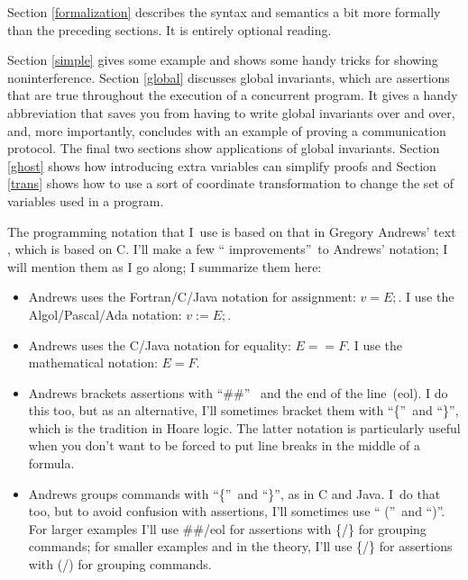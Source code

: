\documentclass[11pt]{article}%
\begin{document}
Section \ref{formalization} describes the syntax and semantics a bit more
formally than the preceding sections. It is entirely optional reading.

Section \ref{simple} gives some example and shows some handy tricks for
showing noninterference. Section \ref{global} discusses global invariants,
which are assertions that are true throughout the execution of a concurrent
program. It gives a handy abbreviation that saves you from having to write
global invariants over and over, and, more importantly, concludes with an
example of proving a communication protocol. The final two sections show
applications of global invariants. Section \ref{ghost} shows how introducing
extra variables can simplify proofs and Section \ref{trans} shows how to use a
sort of coordinate transformation to change the set of variables used in a program.

The programming notation that I\ use is based on that in Gregory Andrews' text
\cite{Andrews2000}, which is based on C. I'll make a few \textquotedblleft
improvements\textquotedblright\ to Andrews' notation; I will mention them as I
go along; I summarize them here:

\begin{itemize}
\item Andrews uses the Fortran/C/Java notation for assignment: $v=E;$. I use
the Algol/Pascal/Ada notation: $v:=E;$.

\item Andrews uses the C/Java notation for equality: $E==F$. I use the
mathematical notation: $E=F$.

\item Andrews brackets assertions with \textquotedblleft\#\#\textquotedblright%
\ and the end of the line\ (eol). I do this too, but as an alternative, I'll
sometimes bracket them with \textquotedblleft\{\textquotedblright\ and
\textquotedblleft\}\textquotedblright, which is the tradition in Hoare logic.
The latter notation is particularly useful when you don't want to be forced to
put line breaks in the middle of a formula.

\item Andrews groups commands with \textquotedblleft\{\textquotedblright\ and
\textquotedblleft\}\textquotedblright, as in C and Java. I\ do that too, but
to avoid confusion with assertions, I'll sometimes use \textquotedblleft%
(\textquotedblright\ and \textquotedblleft)\textquotedblright. For larger
examples I'll use \#\#/eol for assertions with \{/\} for grouping commands;
for smaller examples and in the theory, I'll use \{/\} for assertions with (/)
for grouping commands.
\end{itemize}
\end{document}
